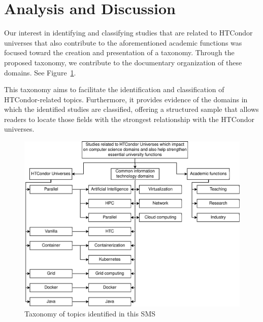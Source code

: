 \section{Analysis and Discussion}\label{sec:analisis-discusion}

Our interest in identifying and classifying studies that are related to HTCondor universes that also contribute to the aforementioned academic functions was focused toward the creation and presentation of a taxonomy. Through the proposed taxonomy, we contribute to the documentary organization of these domains. See Figure~\ref{fig:taxonomia}.

This taxonomy aims to facilitate the identification and classification of HTCondor-related topics. Furthermore, it provides evidence of the domains in which the identified studies are classified, offering a structured sample that allows readers to locate those fields with the strongest relationship with the HTCondor universes.

\begin{figure}
	\centering
	\includegraphics[scale=0.6]{resources/figures/sms-taxonomia.eps}
	\caption{Taxonomy of topics identified in this SMS}
	\label{fig:taxonomia}
\end{figure}
